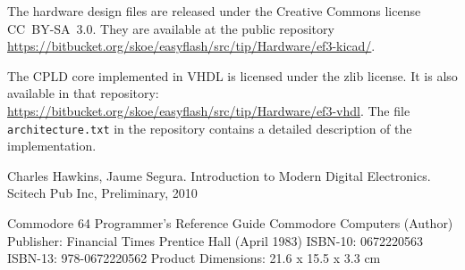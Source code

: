 \documentclass[a4paper]{memoir}
\begin{document}
The hardware design files are released under the Creative Commons
license CC~BY-SA~3.0. They are available at the public repository
\url{https://bitbucket.org/skoe/easyflash/src/tip/Hardware/ef3-kicad/}.

The CPLD core implemented in VHDL is licensed under the zlib
license. It is also available in that repository:
\url{https://bitbucket.org/skoe/easyflash/src/tip/Hardware/ef3-vhdl}.
The file \texttt{architecture.txt} in the repository contains a
detailed description of the implementation.

\cite[Ch.~3]{HS10}

\begin{thebibliography}{999}
 Charles Hawkins, Jaume Segura. Introduction to Modern
Digital Electronics. Scitech Pub Inc, Preliminary, 2010
\end{thebibliography}


Commodore 64 Programmer's Reference Guide
Commodore Computers (Author)
Publisher: Financial Times Prentice Hall (April 1983)
ISBN-10: 0672220563
ISBN-13: 978-0672220562
 Product Dimensions:  21.6 x 15.5 x 3.3 cm
\end{document}
